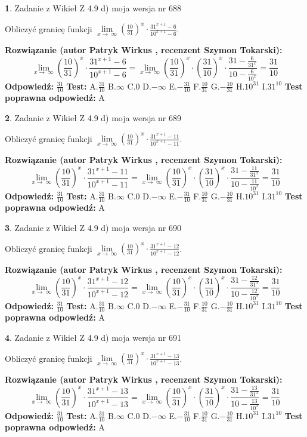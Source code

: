 \documentclass[12pt, a4paper]{article}
\theoremstyle{definition} %
\newtheorem{zad}{}
\newcommand{\zadStart}[1]{\begin{zad}#1\newline}
\newcommand{\zadStop}{\end{zad}}
\newcommand{\rozwStart}[2]{\noindent \textbf{Rozwiązanie (autor #1 , recenzent #2): }\newline}
\newcommand{\rozwStop}{\newline}
\newcommand{\odpStart}{\noindent \textbf{Odpowiedź:}\newline}
\newcommand{\odpStop}{\newline}
\newcommand{\testStart}{\noindent \textbf{Test:}\newline}
\newcommand{\testStop}{\newline}
\newcommand{\kluczStart}{\noindent \textbf{Test poprawna odpowiedź:}\newline}
\newcommand{\kluczStop}{\newline}
\begin{document}
\zadStart{Zadanie z Wikieł Z 4.9 d) moja wersja nr 688}


Obliczyć granicę funkcji  $\lim\limits_{x\to\ \infty}(\frac{10}{31})^{x}\cdot\frac{31^{x+1}-6}{10^{x+1}-6}$.
\zadStop
\rozwStart{Patryk Wirkus}{Szymon Tokarski}
$$\lim\limits_{x\to\ \infty}(\frac{10}{31})^{x}\cdot\frac{31^{x+1}-6}{10^{x+1}-6}=\lim\limits_{x\to\ \infty}(\frac{10}{31})^{x}\cdot(\frac{31}{10})^{x} \cdot \frac{31-\frac{6}{31^{x}}}{10-\frac{6}{10^{x}}} = \frac{31}{10}$$
\rozwStop
\odpStart
$\frac{31}{10}$
\odpStop
\testStart
A.$\frac{31}{10}$ B.$\infty$ C.$0$ D.$-\infty$ E.$-\frac{31}{10}$
F.$\frac{10}{31}$ G.$-\frac{10}{31}$
H.$10^{31}$
I.$31^{10}$
\testStop
\kluczStart
A
\kluczStop



\zadStart{Zadanie z Wikieł Z 4.9 d) moja wersja nr 689}


Obliczyć granicę funkcji  $\lim\limits_{x\to\ \infty}(\frac{10}{31})^{x}\cdot\frac{31^{x+1}-11}{10^{x+1}-11}$.
\zadStop
\rozwStart{Patryk Wirkus}{Szymon Tokarski}
$$\lim\limits_{x\to\ \infty}(\frac{10}{31})^{x}\cdot\frac{31^{x+1}-11}{10^{x+1}-11}=\lim\limits_{x\to\ \infty}(\frac{10}{31})^{x}\cdot(\frac{31}{10})^{x} \cdot \frac{31-\frac{11}{31^{x}}}{10-\frac{11}{10^{x}}} = \frac{31}{10}$$
\rozwStop
\odpStart
$\frac{31}{10}$
\odpStop
\testStart
A.$\frac{31}{10}$ B.$\infty$ C.$0$ D.$-\infty$ E.$-\frac{31}{10}$
F.$\frac{10}{31}$ G.$-\frac{10}{31}$
H.$10^{31}$
I.$31^{10}$
\testStop
\kluczStart
A
\kluczStop



\zadStart{Zadanie z Wikieł Z 4.9 d) moja wersja nr 690}


Obliczyć granicę funkcji  $\lim\limits_{x\to\ \infty}(\frac{10}{31})^{x}\cdot\frac{31^{x+1}-12}{10^{x+1}-12}$.
\zadStop
\rozwStart{Patryk Wirkus}{Szymon Tokarski}
$$\lim\limits_{x\to\ \infty}(\frac{10}{31})^{x}\cdot\frac{31^{x+1}-12}{10^{x+1}-12}=\lim\limits_{x\to\ \infty}(\frac{10}{31})^{x}\cdot(\frac{31}{10})^{x} \cdot \frac{31-\frac{12}{31^{x}}}{10-\frac{12}{10^{x}}} = \frac{31}{10}$$
\rozwStop
\odpStart
$\frac{31}{10}$
\odpStop
\testStart
A.$\frac{31}{10}$ B.$\infty$ C.$0$ D.$-\infty$ E.$-\frac{31}{10}$
F.$\frac{10}{31}$ G.$-\frac{10}{31}$
H.$10^{31}$
I.$31^{10}$
\testStop
\kluczStart
A
\kluczStop



\zadStart{Zadanie z Wikieł Z 4.9 d) moja wersja nr 691}


Obliczyć granicę funkcji  $\lim\limits_{x\to\ \infty}(\frac{10}{31})^{x}\cdot\frac{31^{x+1}-13}{10^{x+1}-13}$.
\zadStop
\rozwStart{Patryk Wirkus}{Szymon Tokarski}
$$\lim\limits_{x\to\ \infty}(\frac{10}{31})^{x}\cdot\frac{31^{x+1}-13}{10^{x+1}-13}=\lim\limits_{x\to\ \infty}(\frac{10}{31})^{x}\cdot(\frac{31}{10})^{x} \cdot \frac{31-\frac{13}{31^{x}}}{10-\frac{13}{10^{x}}} = \frac{31}{10}$$
\rozwStop
\odpStart
$\frac{31}{10}$
\odpStop
\testStart
A.$\frac{31}{10}$ B.$\infty$ C.$0$ D.$-\infty$ E.$-\frac{31}{10}$
F.$\frac{10}{31}$ G.$-\frac{10}{31}$
H.$10^{31}$
I.$31^{10}$
\testStop
\kluczStart
A
\kluczStop
\end{document}

